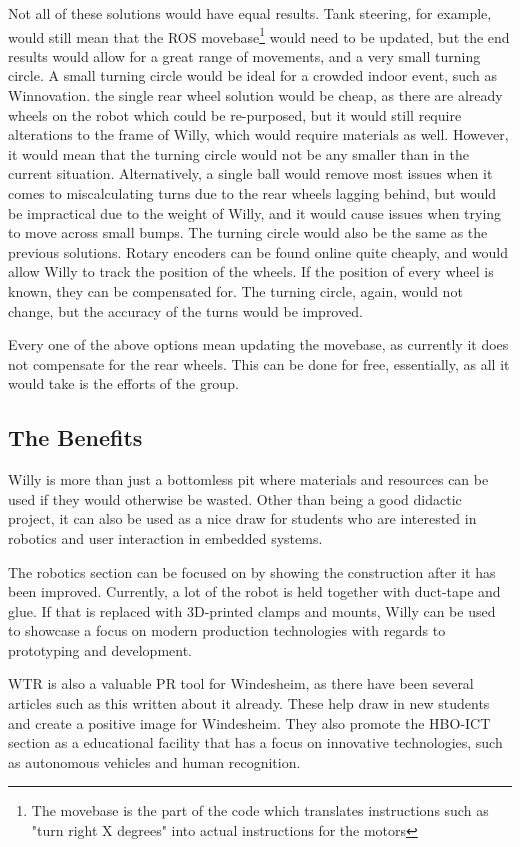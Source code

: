Not all of these solutions would have equal results.
Tank steering, for example, would still mean that the ROS movebase\footnote{The movebase is the part of the code which translates instructions such as "turn right X degrees" into actual instructions for the motors} would need to be updated, but the end results would allow for a great range of movements, and a very small turning circle.
A small turning circle would be ideal for a crowded indoor event, such as Winnovation.
the single rear wheel solution would be cheap, as there are already wheels on the robot which could be re-purposed, but it would still require alterations to the frame of Willy, which would require materials as well.
However, it would mean that the turning circle would not be any smaller than in the current situation.
Alternatively, a single ball would remove most issues when it comes to miscalculating turns due to the rear wheels lagging behind, but would be impractical due to the weight of Willy, and it would cause issues when trying to move across small bumps.
The turning circle would also be the same as the previous solutions.
Rotary encoders can be found online quite cheaply, and would allow Willy to track the position of the wheels.
If the position of every wheel is known, they can be compensated for.
The turning circle, again, would not change, but the accuracy of the turns would be improved.

Every one of the above options mean updating the movebase, as currently it does not compensate for the rear wheels.
This can be done for free, essentially, as all it would take is the efforts of the group.

\subsection{The Benefits}
Willy is more than just a bottomless pit where materials and resources can be used if they would otherwise be wasted.
Other than being a good didactic project, it can also be used as a nice draw for students who are interested in robotics and user interaction in embedded systems.

The robotics section can be focused on by showing the construction after it has been improved.
Currently, a lot of the robot is held together with duct-tape and glue.
If that is replaced with 3D-printed clamps and mounts, Willy can be used to showcase a focus on modern production technologies with regards to prototyping and development.

WTR is also a valuable PR tool for Windesheim, as there have been several articles such as this \cite{stentorwilly} written about it already.
These help draw in new students and create a positive image for Windesheim.
They also promote the HBO-ICT section as a educational facility that has a focus on innovative technologies, such as autonomous vehicles and human recognition.

